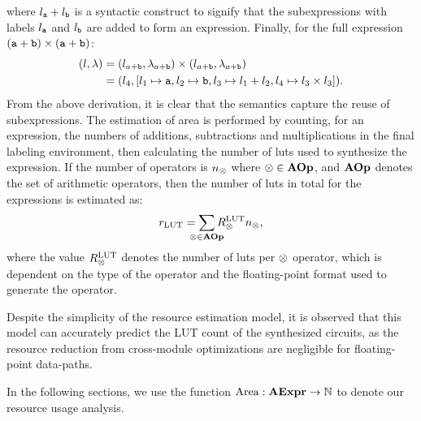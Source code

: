 where $l_{\texttt{a}} + l_{\texttt{b}}$ is a syntactic construct to signify that the
subexpressions with labels $l_{\texttt{a}}$ and $l_{\texttt{b}}$ are added to form an
expression.
Finally, for the full expression $(\texttt{a} + \texttt{b}) \times (\texttt{a} + \texttt{b})$:
\begin{equation}
    \begin{aligned}
        (l, \lambda)
            &= (l_{a + \texttt{b}}, \lambda_{a + \texttt{b}}) \times
               (l_{a + \texttt{b}}, \lambda_{a + \texttt{b}}) \\
            &= (l_4, [l_1\mapsto{\texttt{a}}, l_2\mapsto{\texttt{b}},
                      l_3\mapsto{l_1 + l_2}, l_4\mapsto{l_3 \times l_3}]).
    \end{aligned}
\end{equation}
From the above derivation, it is clear that the semantics capture the reuse
of subexpressions. The estimation of area is performed by counting, for an
expression, the numbers of additions, subtractions and multiplications in the
final labeling environment, then calculating the number of \glspl{lut} used to
synthesize the expression. If the number of operators is $n_\otimes$ where
$\otimes \in \mathbf{AOp}$, and $\mathbf{AOp}$ denotes the set of arithmetic operators,
then the number of \glspl{lut} in total for the expressions is estimated as:
\begin{equation}
    r_\mathrm{LUT} = \sum_{\mathclap{\opsymbol\in\aopset}}
        R^\mathrm{LUT}_\opsymbol n_\opsymbol,
\end{equation}
where the value $R^\mathrm{LUT}_\otimes$ denotes the number of \glspl{lut}
per $\otimes$ operator, which is dependent on the type of the operator and
the floating-point format used to generate the operator.

Despite the simplicity of the resource estimation model, it is observed that
this model can accurately predict the LUT count of the synthesized circuits,
as the resource reduction from cross-module optimizations are negligible for
floating-point data-paths.

In the following sections, we use the function $\operatorname{\mathrm{Area}}: \mathbf{AExpr}\to\mathbb{N}$
to denote our resource usage analysis.
